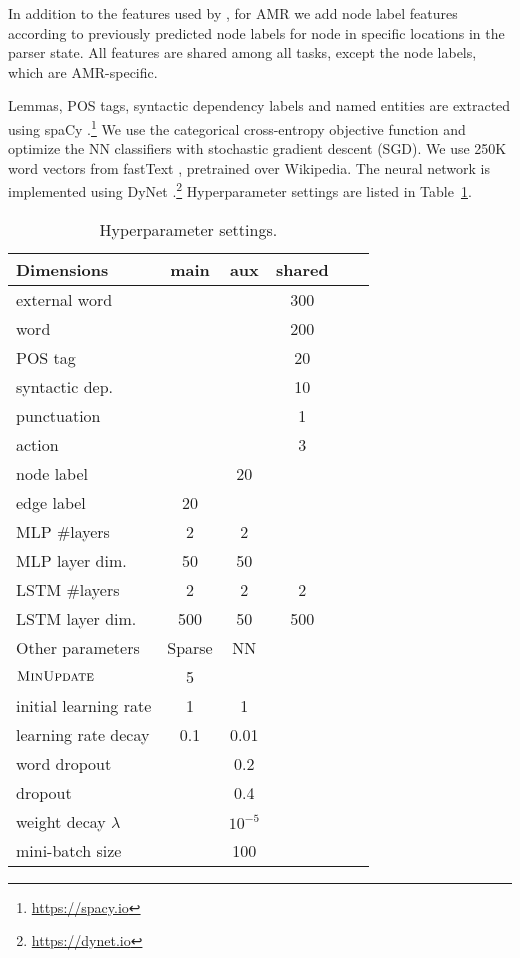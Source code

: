 \documentclass[11pt,a4paper]{article}
\begin{document}
In addition to the features used by \citet{hershcovich2017a},
for AMR we add node label features according to
previously predicted node labels for node in specific locations in the parser state.
All features are shared among all tasks, except the node labels, which are
AMR-specific.

Lemmas, POS tags, syntactic dependency labels and named entities are extracted using spaCy
\cite{spacy2}.\footnote{\url{https://spacy.io}}
We use the categorical cross-entropy objective function and optimize the
NN classifiers with stochastic gradient descent (SGD).
We use 250K word vectors from fastText \cite{bojanowski2016enriching}, pretrained over Wikipedia.
The neural network is implemented using DyNet \cite{neubig2017dynet}.\footnote{\url{https://dynet.io}}
Hyperparameter settings are listed in Table~\ref{tab:hyperparams}.

\begin{table}
\begin{tabular}{l|ccccc}
\hline
\footnotesize Dimensions &  main & aux & shared \\
\hline
external word & & & 300 \\
word & & & 200 \\
POS tag & & & 20 \\
syntactic dep. & & & 10 \\
punctuation & & & 1 \\
action & & & 3 \\
node label & & 20 \\
edge label & 20 \\
MLP \#layers & 2 & 2 \\
MLP layer dim. & 50 & 50 \\
LSTM \#layers & 2 & 2 & 2 \\
LSTM layer dim. & 500 & 50 & 500 \\
\hline\hline
\footnotesize Other parameters & Sparse & NN \\
\hline
$\textsc{MinUpdate}$ & 5 \\
initial learning rate & 1 & 1 \\
learning rate decay & 0.1 & 0.01 \\
word dropout & & 0.2 \\
dropout & & 0.4 \\
weight decay $\lambda$ & & $10^{-5}$ \\
mini-batch size & & 100
\end{tabular}
\caption{Hyperparameter settings.\label{tab:hyperparams}}
\end{table}
\end{document}
